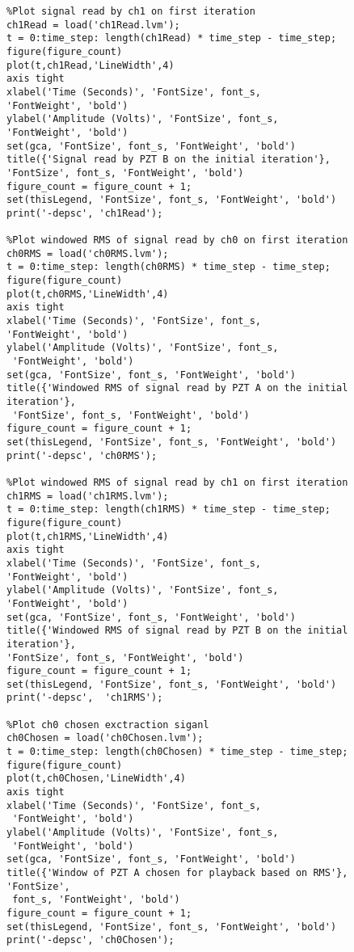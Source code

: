 \begin{lstlisting}
%Plot signal read by ch1 on first iteration
ch1Read = load('ch1Read.lvm');
t = 0:time_step: length(ch1Read) * time_step - time_step;
figure(figure_count)
plot(t,ch1Read,'LineWidth',4)
axis tight
xlabel('Time (Seconds)', 'FontSize', font_s, 
'FontWeight', 'bold')
ylabel('Amplitude (Volts)', 'FontSize', font_s, 
'FontWeight', 'bold')
set(gca, 'FontSize', font_s, 'FontWeight', 'bold')
title({'Signal read by PZT B on the initial iteration'}, 
'FontSize', font_s, 'FontWeight', 'bold')
figure_count = figure_count + 1;
set(thisLegend, 'FontSize', font_s, 'FontWeight', 'bold')
print('-depsc', 'ch1Read');

%Plot windowed RMS of signal read by ch0 on first iteration
ch0RMS = load('ch0RMS.lvm');
t = 0:time_step: length(ch0RMS) * time_step - time_step;
figure(figure_count)
plot(t,ch0RMS,'LineWidth',4)
axis tight
xlabel('Time (Seconds)', 'FontSize', font_s, 
'FontWeight', 'bold')
ylabel('Amplitude (Volts)', 'FontSize', font_s,
 'FontWeight', 'bold')
set(gca, 'FontSize', font_s, 'FontWeight', 'bold')
title({'Windowed RMS of signal read by PZT A on the initial iteration'},
 'FontSize', font_s, 'FontWeight', 'bold')
figure_count = figure_count + 1;
set(thisLegend, 'FontSize', font_s, 'FontWeight', 'bold')
print('-depsc', 'ch0RMS');

%Plot windowed RMS of signal read by ch1 on first iteration
ch1RMS = load('ch1RMS.lvm');
t = 0:time_step: length(ch1RMS) * time_step - time_step;
figure(figure_count)
plot(t,ch1RMS,'LineWidth',4)
axis tight
xlabel('Time (Seconds)', 'FontSize', font_s, 
'FontWeight', 'bold')
ylabel('Amplitude (Volts)', 'FontSize', font_s, 
'FontWeight', 'bold')
set(gca, 'FontSize', font_s, 'FontWeight', 'bold')
title({'Windowed RMS of signal read by PZT B on the initial iteration'}, 
'FontSize', font_s, 'FontWeight', 'bold')
figure_count = figure_count + 1;
set(thisLegend, 'FontSize', font_s, 'FontWeight', 'bold')
print('-depsc',  'ch1RMS');

%Plot ch0 chosen exctraction siganl
ch0Chosen = load('ch0Chosen.lvm');
t = 0:time_step: length(ch0Chosen) * time_step - time_step;
figure(figure_count)
plot(t,ch0Chosen,'LineWidth',4)
axis tight
xlabel('Time (Seconds)', 'FontSize', font_s,
 'FontWeight', 'bold')
ylabel('Amplitude (Volts)', 'FontSize', font_s,
 'FontWeight', 'bold')
set(gca, 'FontSize', font_s, 'FontWeight', 'bold')
title({'Window of PZT A chosen for playback based on RMS'}, 'FontSize',
 font_s, 'FontWeight', 'bold')
figure_count = figure_count + 1;
set(thisLegend, 'FontSize', font_s, 'FontWeight', 'bold')
print('-depsc', 'ch0Chosen');


\end{lstlisting}
